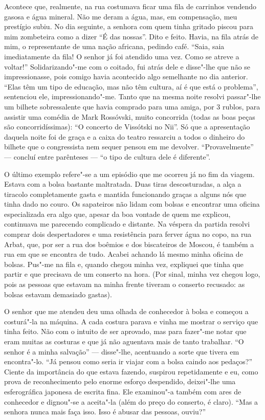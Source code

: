 Acontece que, realmente, na rua costumava ficar uma fila de carrinhos
vendendo gasosa e água mineral. Não me deram a água, mas, em
compensação, meu prestígio subiu. No dia seguinte, a senhora com quem
tinha gritado piscou para mim zombeteira como a dizer ``É das nossas''.
Dito e feito. Havia, na fila atrás de mim, o representante de uma nação
africana, pedindo café. ``Saia, saia imediatamente da fila! O senhor já
foi atendido uma vez. Como se atreve a voltar!'' Solidarizando"-me com o
coitado, fui atrás dele e disse"-lhe que não se impressionasse, pois
comigo havia acontecido algo semelhante no dia anterior. ``Elas têm um
tipo de educação, mas não têm cultura, aí é que está o problema'',
sentenciou ele, impressionando"-me. Tanto que na mesma noite resolvi
passar"-lhe um bilhete sobressalente que havia comprado para uma amiga,
por 3 rublos, para assistir uma comédia de Mark Rossóvski, muito
concorrida (todas as boas peças são concorridíssimas): ``O concerto de
Vissótski no Nii''. Só que a apresentação daquela noite foi de graça e a
caixa do teatro ressarciu a todos o dinheiro do bilhete que o
congressista nem sequer pensou em me devolver. ``Provavelmente'' ---
concluí entre parênteses --- ``o tipo de cultura dele é diferente''.

O último exemplo refere"-se a um episódio que me ocorreu já no fim da
viagem. Estava com a bolsa bastante maltratada. Duas tiras
descosturadas, a alça a tiracolo completamente gasta e mantida
funcionando graças a alguns nós que tinha dado no couro. Os sapateiros
não lidam com bolsas e encontrar uma oficina especializada era algo que,
apesar da boa vontade de quem me explicou, continuava me parecendo
complicado e distante. Na véspera da partida resolvi comprar dois
despertadores e uma resistência para ferver água no copo, na rua Arbat,
que, por ser a rua dos boêmios e dos biscateiros de Moscou, é também a
rua em que se encontra de tudo. Acabei achando lá mesmo minha oficina de
bolsas. Pus"-me na fila e, quando chegou minha vez, expliquei que tinha
que partir e que precisava de um conserto na hora. (Por sinal, minha vez
chegou logo, pois as pessoas que estavam na minha frente tiveram o
conserto recusado: as bolsas estavam demasiado gastas).

O senhor que me atendeu deu uma olhada de conhecedor à bolsa e começou a
costurá"-la na máquina. A cada costura parava e vinha me mostrar o
serviço que tinha feito. Não com o intuito de ser aprovado, mas para
fazer"-me notar que eram muitas as costuras e que já não aguentava mais
de tanto trabalhar. ``O senhor é a minha salvação'' --- disse"-lhe,
acentuando a sorte que tivera em encontra"-lo. ``Já pensou como seria
ir viajar com a bolsa caindo aos pedaços?'' Ciente da importância do
que estava fazendo, suspirou repetidamente e eu, como prova de
reconhecimento pelo enorme esforço despendido, deixei"-lhe uma
esferográfica japonesa de escrita fina. Ele examinou"-a também com ares
de conhecedor e dignou"-se a aceita"-la (além do preço do conserto, é
claro). ``Mas a senhora nunca mais faça isso. Isso é abusar das pessoas,
ouviu?''

